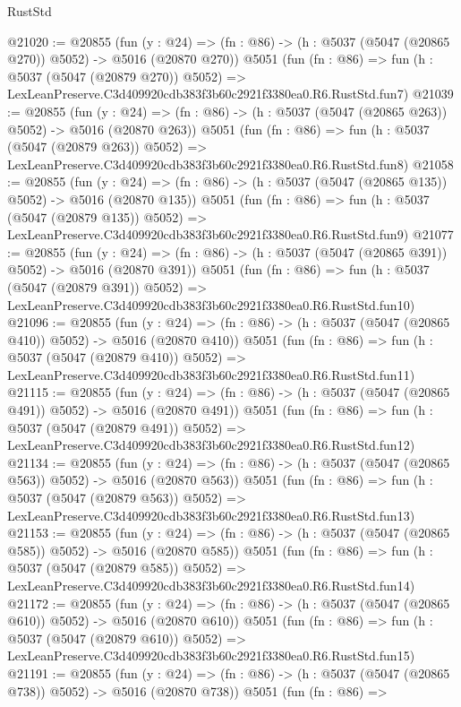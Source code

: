 \begin{lexlean}{RustStd}
\begin{coremodule}
@21020 := @20855
    (fun (y : @24) => (fn : @86) -> (h : @5037 (@5047 (@20865 @270)) @5052) -> @5016 (@20870 @270))
    @5051
    (fun (fn : @86) =>
    fun (h : @5037 (@5047 (@20879 @270)) @5052) =>
    LexLeanPreserve.C3d409920cdb383f3b60c2921f3380ea0.R6.RustStd.fun7)
@21039 := @20855
    (fun (y : @24) => (fn : @86) -> (h : @5037 (@5047 (@20865 @263)) @5052) -> @5016 (@20870 @263))
    @5051
    (fun (fn : @86) =>
    fun (h : @5037 (@5047 (@20879 @263)) @5052) =>
    LexLeanPreserve.C3d409920cdb383f3b60c2921f3380ea0.R6.RustStd.fun8)
@21058 := @20855
    (fun (y : @24) => (fn : @86) -> (h : @5037 (@5047 (@20865 @135)) @5052) -> @5016 (@20870 @135))
    @5051
    (fun (fn : @86) =>
    fun (h : @5037 (@5047 (@20879 @135)) @5052) =>
    LexLeanPreserve.C3d409920cdb383f3b60c2921f3380ea0.R6.RustStd.fun9)
@21077 := @20855
    (fun (y : @24) => (fn : @86) -> (h : @5037 (@5047 (@20865 @391)) @5052) -> @5016 (@20870 @391))
    @5051
    (fun (fn : @86) =>
    fun (h : @5037 (@5047 (@20879 @391)) @5052) =>
    LexLeanPreserve.C3d409920cdb383f3b60c2921f3380ea0.R6.RustStd.fun10)
@21096 := @20855
    (fun (y : @24) => (fn : @86) -> (h : @5037 (@5047 (@20865 @410)) @5052) -> @5016 (@20870 @410))
    @5051
    (fun (fn : @86) =>
    fun (h : @5037 (@5047 (@20879 @410)) @5052) =>
    LexLeanPreserve.C3d409920cdb383f3b60c2921f3380ea0.R6.RustStd.fun11)
@21115 := @20855
    (fun (y : @24) => (fn : @86) -> (h : @5037 (@5047 (@20865 @491)) @5052) -> @5016 (@20870 @491))
    @5051
    (fun (fn : @86) =>
    fun (h : @5037 (@5047 (@20879 @491)) @5052) =>
    LexLeanPreserve.C3d409920cdb383f3b60c2921f3380ea0.R6.RustStd.fun12)
@21134 := @20855
    (fun (y : @24) => (fn : @86) -> (h : @5037 (@5047 (@20865 @563)) @5052) -> @5016 (@20870 @563))
    @5051
    (fun (fn : @86) =>
    fun (h : @5037 (@5047 (@20879 @563)) @5052) =>
    LexLeanPreserve.C3d409920cdb383f3b60c2921f3380ea0.R6.RustStd.fun13)
@21153 := @20855
    (fun (y : @24) => (fn : @86) -> (h : @5037 (@5047 (@20865 @585)) @5052) -> @5016 (@20870 @585))
    @5051
    (fun (fn : @86) =>
    fun (h : @5037 (@5047 (@20879 @585)) @5052) =>
    LexLeanPreserve.C3d409920cdb383f3b60c2921f3380ea0.R6.RustStd.fun14)
@21172 := @20855
    (fun (y : @24) => (fn : @86) -> (h : @5037 (@5047 (@20865 @610)) @5052) -> @5016 (@20870 @610))
    @5051
    (fun (fn : @86) =>
    fun (h : @5037 (@5047 (@20879 @610)) @5052) =>
    LexLeanPreserve.C3d409920cdb383f3b60c2921f3380ea0.R6.RustStd.fun15)
@21191 := @20855
    (fun (y : @24) => (fn : @86) -> (h : @5037 (@5047 (@20865 @738)) @5052) -> @5016 (@20870 @738))
    @5051
    (fun (fn : @86) =>

\end{coremodule}
\end{lexlean}
